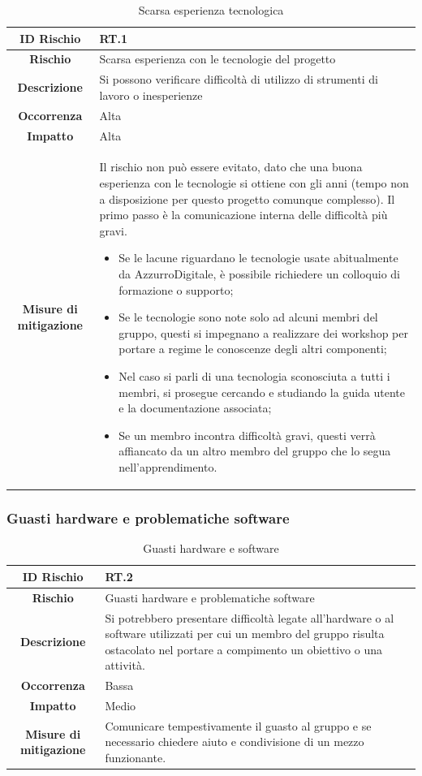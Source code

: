 \documentclass[10pt, a4paper]{article}
\begin{document}
{{{{\renewcommand{\arraystretch}{1.5}
\begin{table}[H]
\begin{tabularx}{\textwidth}{c|X}
\textbf{ID Rischio} & RT.1 \\
\hline
\textbf{Rischio} & Scarsa esperienza con le tecnologie del progetto \\
\hline
\textbf{Descrizione} & Si possono verificare difficoltà di utilizzo di strumenti di lavoro o inesperienze\\
\hline
\textbf{Occorrenza} & Alta\\
\hline
\textbf{Impatto} & Alta\\
\hline
\textbf{Misure di mitigazione} & Il rischio non può essere evitato, dato che una buona esperienza con le tecnologie si ottiene con gli anni (tempo non a disposizione per questo progetto comunque complesso). Il primo passo è la comunicazione interna delle difficoltà più gravi.
\begin{itemize}
    \item Se le lacune riguardano le tecnologie usate abitualmente da AzzurroDigitale, è possibile richiedere un colloquio di formazione o supporto;
    \item Se le tecnologie sono note solo ad alcuni membri del gruppo, questi si impegnano a realizzare dei workshop per portare a regime le conoscenze degli altri componenti;
    \item Nel caso si parli di una tecnologia sconosciuta a tutti i membri, si prosegue cercando e studiando la guida utente e la documentazione associata;
    \item Se un membro incontra difficoltà gravi, questi verrà affiancato da un altro membro del gruppo che lo segua nell'apprendimento.
\end{itemize}
\end{tabularx}
\caption{Scarsa esperienza tecnologica}
\end{table}
\subsubsection{Guasti hardware e problematiche software}
{\renewcommand{\arraystretch}{1.5}
\begin{table}[H]
\begin{tabularx}{\textwidth}{c|X}
\textbf{ID Rischio} & RT.2 \\
\hline
\textbf{Rischio} & Guasti hardware e problematiche software \\
\hline
\textbf{Descrizione} & Si potrebbero presentare difficoltà legate all’hardware o al software utilizzati per cui un membro del gruppo risulta ostacolato nel portare a compimento un obiettivo o una attività. \\
\hline
\textbf{Occorrenza} & Bassa \\
\hline
\textbf{Impatto} & Medio\\
\hline
\textbf{Misure di mitigazione} & Comunicare tempestivamente il guasto al gruppo e se necessario chiedere aiuto e condivisione di un mezzo funzionante.\\
\end{tabularx}
\caption{Guasti hardware e software}
\end{table}
}}}}}
\end{document}
